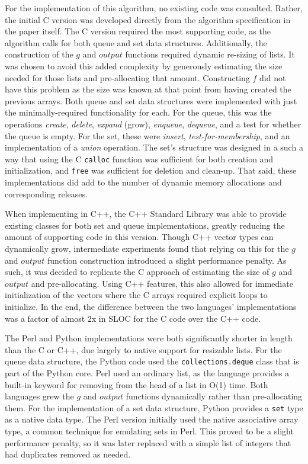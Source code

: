 For the implementation of this algorithm, no existing code was consulted. Rather, the initial C version was developed directly from the algorithm specification in the paper itself. The C version required the most supporting code, as the algorithm calls for both queue and set data structures. Additionally, the construction of the $g$ and $output$ functions required dynamic re-sizing of lists. It was chosen to avoid this added complexity by generously estimating the size needed for those lists and pre-allocating that amount. Constructing $f$ did not have this problem as the size was known at that point from having created the previous arrays. Both queue and set data structures were implemented with just the minimally-required functionality for each. For the queue, this was the operations \textit{create}, \textit{delete}, \textit{expand} (grow), \textit{enqueue}, \textit{dequeue}, and a test for whether the queue is empty. For the set, these were \textit{insert}, \textit{test-for-membership}, and an implementation of a \textit{union} operation. The set's structure was designed in a such a way that using the C \texttt{calloc} function was sufficient for both creation and initialization, and \texttt{free} was sufficient for deletion and clean-up. That said, these implementations did add to the number of dynamic memory allocations and corresponding releases.

When implementing in C++, the C++ Standard Library was able to provide existing classes for both set and queue implementations, greatly reducing the amount of supporting code in this version. Though C++ vector types can dynamically grow, intermediate experiments found that relying on this for the $g$ and $output$ function construction introduced a slight performance penalty. As such, it was decided to replicate the C approach of estimating the size of $g$ and $output$ and pre-allocating. Using C++ features, this also allowed for immediate initialization of the vectors where the C arrays required explicit loops to initialize. In the end, the difference between the two languages' implementations was a factor of almost 2x in SLOC for the C code over the C++ code.

The Perl and Python implementations were both significantly shorter in length than the C or C++, due largely to native support for resizable lists. For the queue data structure, the Python code used the \texttt{collections.deque} class that is part of the Python core. Perl used an ordinary list, as the language provides a built-in keyword for removing from the head of a list in O(1) time. Both languages grew the $g$ and $output$ functions dynamically rather than pre-allocating them. For the implementation of a set data structure, Python provides a \texttt{set} type as a native data type. The Perl version initially used the native associative array type, a common technique for emulating sets in Perl. This proved to be a slight performance penalty, so it was later replaced with a simple list of integers that had duplicates removed as needed.

